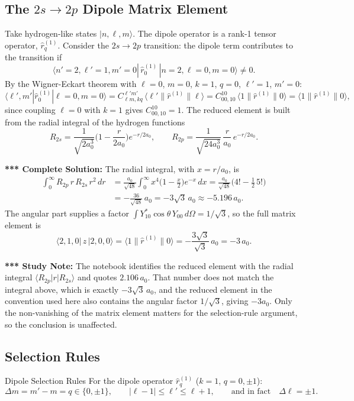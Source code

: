 \documentclass[11pt,a4paper]{article}
\begin{document}
\subsection{The \texorpdfstring{$2s\to2p$}{2s to 2p} Dipole Matrix Element}
Take hydrogen-like states $|n,\ell,m\rangle$. The dipole operator is a rank-1 tensor operator, $\hat r^{(1)}_q$. Consider the $2s\to2p$ transition: the dipole term contributes to the transition if
\[
\langle n'=2,\ell'=1,m'=0|\,\hat r^{(1)}_0\,|n=2,\ell=0,m=0\rangle\neq0 .
\]
By the Wigner-Eckart theorem with $\ell=0$, $m=0$, $k=1$, $q=0$, $\ell'=1$, $m'=0$:
\[
\langle\ell',m'|\hat r^{(1)}_0|\ell=0,m=0\rangle=C^{\ell'm'}_{\ell m,kq}\,\langle\ell'\|\hat r^{(1)}\|\ell\rangle=C^{10}_{00,10}\,\langle1\|\hat r^{(1)}\|0\rangle=\langle1\|\hat r^{(1)}\|0\rangle,
\]
since coupling $\ell=0$ with $k=1$ gives $C^{10}_{00,10}=1$. The reduced element is built from the radial integral of the hydrogen functions
\[
R_{2s}=\frac1{\sqrt{2a_0^3}}\Big(1-\frac r{2a_0}\Big)e^{-r/2a_0},\qquad R_{2p}=\frac1{\sqrt{24a_0^3}}\,\frac r{a_0}\,e^{-r/2a_0}.
\]

\textbf{*** Complete Solution:} The radial integral, with $x=r/a_0$, is
\begin{align*}
\int_0^\infty R_{2p}\,r\,R_{2s}\,r^2\,dr&=\frac{a_0}{\sqrt{48}}\int_0^\infty x^4\Big(1-\frac x2\Big)e^{-x}\,dx=\frac{a_0}{\sqrt{48}}\big(4!-\tfrac12\,5!\big)\\
&=-\frac{36}{\sqrt{48}}\,a_0=-3\sqrt3\,a_0\approx-5.196\,a_0 .
\end{align*}
The angular part supplies a factor $\int Y_{10}^*\cos\theta\,Y_{00}\,d\Omega=1/\sqrt3$, so the full matrix element is
\[
\langle2,1,0|\,z\,|2,0,0\rangle=\langle1\|\hat r^{(1)}\|0\rangle=-\frac{3\sqrt3}{\sqrt3}\,a_0=-3\,a_0 .
\]

\textbf{*** Study Note:} The notebook identifies the reduced element with the radial integral $\langle R_{2p}|r|R_{2s}\rangle$ and quotes $2.106\,a_0$. That number does not match the integral above, which is exactly $-3\sqrt3\,a_0$, and the reduced element in the convention used here also contains the angular factor $1/\sqrt3$, giving $-3a_0$. Only the non-vanishing of the matrix element matters for the selection-rule argument, so the conclusion is unaffected.

\subsection{Selection Rules}
\begin{thm}{Dipole Selection Rules}
For the dipole operator $\hat r^{(1)}_q$ ($k=1$, $q=0,\pm1$):
\[
\Delta m=m'-m=q\in\{0,\pm1\},\qquad |\ell-1|\le\ell'\le\ell+1,\qquad\text{and in fact}\quad\Delta\ell=\pm1 .
\]
\end{thm}
\end{document}

